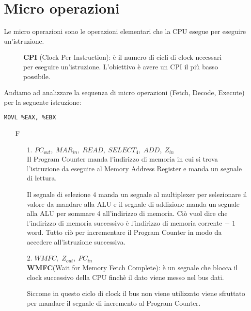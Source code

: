 \documentclass[a4paper]{article}
\theoremstyle{break}
\theoremstyle{break}
\theoremstyle{break}
\theoremstyle{break}
\begin{document}
\section{Micro operazioni}
Le micro operazioni sono le operazioni elementari che la CPU esegue per eseguire
un'istruzione.

\begin{figure}[H]
	\begin{define}
		\textbf{CPI} (Clock Per Instruction): è il numero di cicli di clock necessari per
		eseguire un'istruzione. L'obiettivo è avere un CPI il più basso possibile.
	\end{define}
\end{figure}

\begin{example}
	Andiamo ad analizzare la sequenza di micro operazioni (Fetch, Decode, Execute) per la
	seguente istruzione:
	\begin{center}
		\texttt{MOVL \%EAX, \%EBX}
	\end{center}

	\begin{enumerate}
		\item[F]
		      \begin{enumerate}
			      \item[1.] \( PC_{out},\; MAR_{in},\; READ ,\; SELECT_4,\; ADD,\; Z_{in}\) \\
			            Il Program Counter manda l'indirizzo di memoria in cui si trova l'istruzione da eseguire
			            al Memory Address Register e manda un segnale di lettura.

			            Il segnale di selezione 4 manda un segnale al multiplexer per selezionare il valore
			            da mandare alla ALU e il segnale di addizione manda un segnale alla ALU per sommare
			            4 all'indirizzo di memoria. Ciò vuol dire che l'indirizzo di memoria successivo è
			            l'indirizzo di memoria corrente + 1 word. Tutto ciò per incrementare il Program
			            Counter in modo da accedere all'istruzione successiva.

			      \item[2.] \( WMFC,\; Z_{out},\; PC_{in}\)  \\
			            \textbf{WMFC}(Wait for Memory Fetch Complete): è un segnale che blocca il clock
			            successivo della CPU finchè il dato viene messo nel bus dati.

			            Siccome in questo ciclo di clock il bus non viene utilizzato viene sfruttato per
			            mandare il segnale di incremento al Program Counter.


\end{enumerate}
\end{enumerate}
\end{example}
\end{document}
